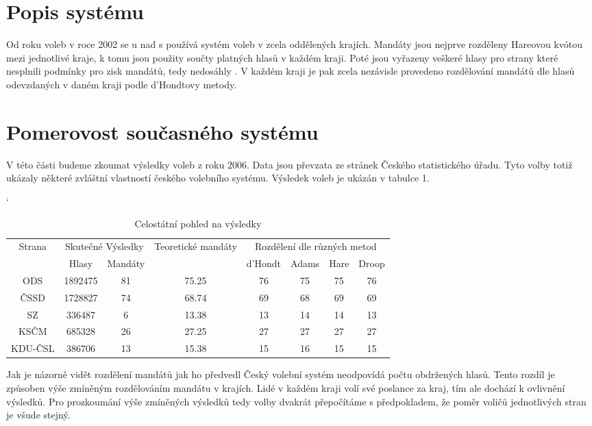 \documentclass[12pt]{report}
\begin{document}
\section{Popis systému} Od roku voleb v roce 2002 se u nad s používá systém voleb v zcela oddělených krajích.
Mandáty jsou nejprve rozděleny Hareovou kvótou mezi jednotlivé kraje, k tomu jsou použity součty platných hlasů v každém kraji.
Poté jsou vyřazeny veškeré hlasy pro strany které nesplnili podmínky pro zisk mandátů, tedy nedosáhly .
V každém kraji je pak zcela nezávisle provedeno rozdělování mandátů dle hlasů odevzdaných v daném kraji podle d'Hondtovy metody.
\section{Pomerovost současného systému} V této části budeme zkoumat výsledky voleb z roku 2006.
Data jsou převzata ze stránek Českého statistického úřadu.\autocite{CSU} Tyto volby totiž ukázaly některé zvláštní vlastností českého volebního systému.
Výsledek voleb je ukázán v tabulce 1.
\begin{table}[p]
\catcode`
\begin{tabular}{|c|c|c|c|c|c|c|c|} \hline \multirow{2}{*}{Strana} & \multicolumn{2}{|c|}{Skutečné Výsledky} & \multirow{2}{*}{Teoretické mandáty} & \multicolumn{4}{|c|}{Rozdělení dle různých metod} \\
\cline{2-3} \cline{5-8} & Hlasy & Mandáty & & d'Hondt & Adams & Hare & Droop \\
\hline ODS & 1892475 & 81 & 75.25 & 76 & 75 & 75 & 76 \\
\hline ČSSD & 1728827 & 74 & 68.74 & 69 & 68 & 69 & 69 \\
\hline SZ & 336487 & 6 & 13.38 & 13 & 14 & 14 & 13 \\
\hline KSČM & 685328 & 26 & 27.25 & 27 & 27 & 27 & 27 \\
\hline KDU-ČSL & 386706 & 13 & 15.38 & 15 & 16 & 15 & 15 \\
\hline \end{tabular} \caption{Celostátní pohled na výsledky} \end{table} Jak je názorně vidět rozdělení mandátů jak ho předvedl Český volební systém neodpovídá počtu obdržených hlasů.
Tento rozdíl je způsoben výše zmíněným rozdělováním mandátu v krajích.
Lidé v každém kraji volí své poslance  za kraj, tím ale dochází k ovlivnění výsledků.
Pro prozkoumání výše zmíněných výsledků tedy volby dvakrát přepočítáme s předpokladem, že poměr voličů jednotlivých stran je všude stejný.
\end{document}
